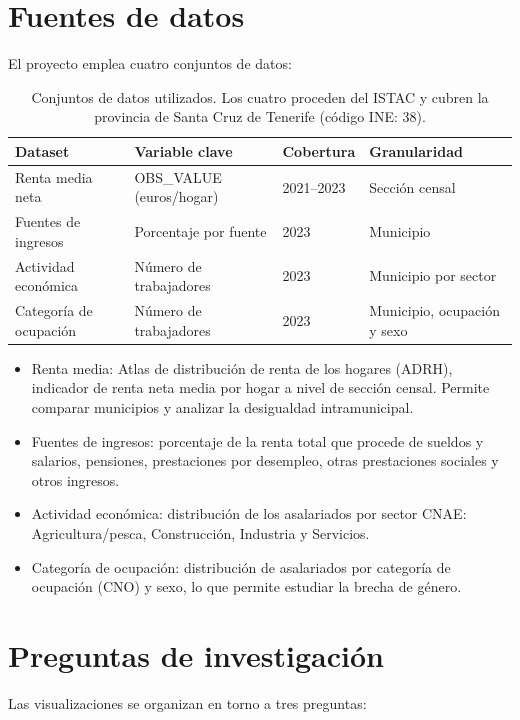 \documentclass[spanish,a4paper,12pt,oneside]{extreport}
\begin{document}
\section{Fuentes de datos}

El proyecto emplea cuatro conjuntos de datos:

\begin{table}[H]
\centering
\begin{tabular}{llp{4.5cm}p{4cm}}
\toprule
Dataset & Variable clave & Cobertura & Granularidad \\
\midrule
Renta media neta & OBS\_VALUE (euros/hogar) & 2021--2023 & Sección censal \\
Fuentes de ingresos & Porcentaje por fuente & 2023 & Municipio \\
Actividad económica & Número de trabajadores & 2023 & Municipio por sector \\
Categoría de ocupación & Número de trabajadores & 2023 & Municipio, ocupación y sexo \\
\bottomrule
\end{tabular}
\caption{Conjuntos de datos utilizados. Los cuatro proceden del ISTAC y cubren la provincia de Santa Cruz de Tenerife (código INE: 38).}
\end{table}

\begin{itemize}
  \item Renta media: Atlas de distribución de renta de los hogares (ADRH), indicador de renta neta media por hogar a nivel de sección censal. Permite comparar municipios y analizar la desigualdad intramunicipal.
  \item Fuentes de ingresos: porcentaje de la renta total que procede de sueldos y salarios, pensiones, prestaciones por desempleo, otras prestaciones sociales y otros ingresos.
  \item Actividad económica: distribución de los asalariados por sector CNAE: Agricultura/pesca, Construcción, Industria y Servicios.
  \item Categoría de ocupación: distribución de asalariados por categoría de ocupación (CNO) y sexo, lo que permite estudiar la brecha de género.
\end{itemize}

\section{Preguntas de investigación}

Las visualizaciones se organizan en torno a tres preguntas:
\end{document}
